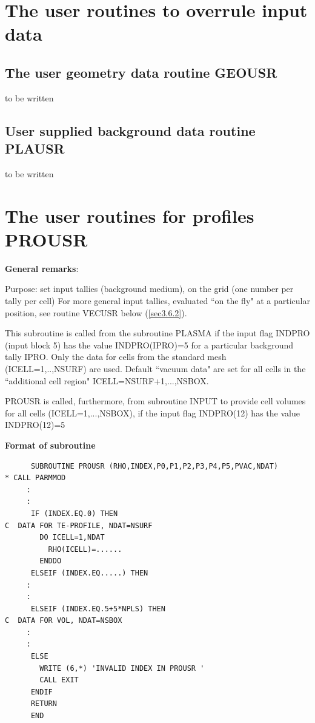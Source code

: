 \newpage

\section{The user routines to overrule input data}
\label{sec3.5}
\subsection{The user geometry data routine GEOUSR} \label{sec3.5.1}
 to be written
\newpage
\subsection{User supplied background data routine PLAUSR}
\label{sec3.5.2}
 to be written
\section{The user routines for profiles PROUSR}
\label{sec3.6}
\medskip

\noindent

{\bf General remarks}:

\medskip

\noindent

Purpose: set input tallies (background medium), on the grid (one number per tally per cell)
For more general input tallies, evaluated ``on the fly" at a particular position, see routine VECUSR
below (\ref{sec3.6.2}).

This subroutine is called from the subroutine PLASMA
if the input flag INDPRO (input block 5) has the value INDPRO(IPRO)=5
for a particular background tally IPRO.
Only the data for cells from the standard mesh (ICELL=1,..,NSURF)
are used. Default ``vacuum data" are set for all cells in the ``additional
cell region" ICELL=NSURF+1,...,NSBOX.

PROUSR is called, furthermore, from subroutine INPUT to provide cell volumes for all
cells (ICELL=1,...,NSBOX), if the input flag INDPRO(12) has the value INDPRO(12)=5

\medskip

\noindent

{\bf Format of subroutine}

\medskip

\noindent

\begin{verbatim}
      SUBROUTINE PROUSR (RHO,INDEX,P0,P1,P2,P3,P4,P5,PVAC,NDAT)
* CALL PARMMOD
     :
     :
      IF (INDEX.EQ.0) THEN
C  DATA FOR TE-PROFILE, NDAT=NSURF
        DO ICELL=1,NDAT
          RHO(ICELL)=......
        ENDDO
      ELSEIF (INDEX.EQ.....) THEN
     :
     :
      ELSEIF (INDEX.EQ.5+5*NPLS) THEN
C  DATA FOR VOL, NDAT=NSBOX
     :
     :
      ELSE
        WRITE (6,*) 'INVALID INDEX IN PROUSR '
        CALL EXIT
      ENDIF
      RETURN
      END
\end{verbatim}

